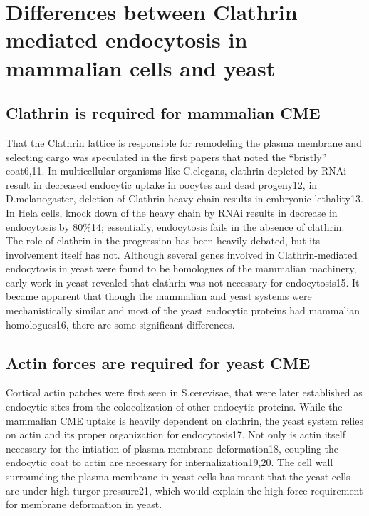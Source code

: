 	
\section{Differences between Clathrin mediated endocytosis in mammalian cells  and yeast}
		\subsection{Clathrin is required for mammalian CME}
		That the Clathrin lattice is responsible for remodeling the plasma membrane and selecting cargo was speculated in the first papers that noted the “bristly” coat6,11.  In multicellular organisms like C.elegans, clathrin depleted by RNAi result in decreased endocytic uptake in oocytes and dead progeny12, in D.melanogaster, deletion of Clathrin heavy chain results in embryonic lethality13. In Hela cells, knock down of the heavy chain by RNAi results in decrease in endocytosis by 80\%14; essentially, endocytosis fails in the absence of clathrin. The role of clathrin in the progression has been heavily debated, but its involvement itself has not. Although several genes involved in Clathrin-mediated endocytosis in yeast were found to be homologues of the mammalian machinery, early work in yeast revealed that clathrin was not necessary for endocytosis15. It became apparent that though the mammalian and yeast systems were mechanistically similar and most of the yeast endocytic proteins had mammalian homologues16, there are some significant differences. 

		\subsection{Actin forces are required for yeast CME}
		Cortical actin patches were first seen in S.cerevisae, that were later established as endocytic sites from the colocolization of other endocytic proteins. While the mammalian CME uptake is heavily dependent on clathrin, the yeast system relies on actin and its proper organization for endocytosis17. Not only is actin itself necessary for the intiation of plasma membrane deformation18, coupling the endocytic coat to actin are necessary for internalization19,20.  The cell wall surrounding the plasma membrane in yeast cells has meant that the yeast cells are under high turgor pressure21, which would explain the high force requirement for membrane deformation in yeast. 

	
